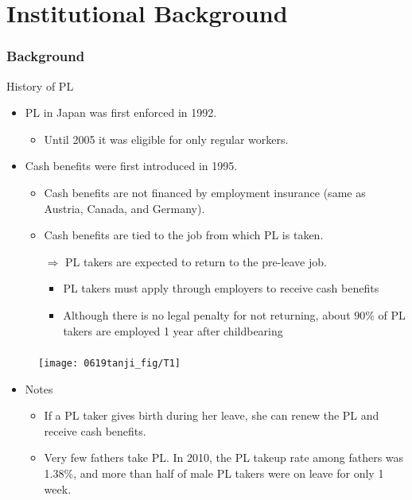 \documentclass[dvipdfmx,11pt]{beamer}
\begin{document}
\section{Institutional Background}

\begin{frame}\frametitle{Background}
  History of PL
  \begin{itemize}
    \item PL in Japan was first enforced in 1992.
    \begin{itemize}
      \item Until 2005 it was eligible for only regular workers.
    \end{itemize}
    \item Cash benefits were first introduced in 1995.
    \begin{itemize}
      \item Cash benefits are not financed by employment insurance (same as Austria, Canada, and Germany).
      \item Cash benefits are tied to the job from which PL is taken.

      $\Rightarrow$ PL takers are expected to return to the pre-leave job.
      \begin{itemize}
        \item PL takers must apply through employers to receive cash benefits
        \item Although there is no legal penalty for not returning, about 90\% of PL takers are employed 1 year after childbearing
      \end{itemize}
    \end{itemize}
  \end{itemize}
\end{frame}

\begin{frame}\frametitle{}
  \begin{figure}[h]
    \centering
    \texttt{[image: 0619tanji\_fig/T1]}
    \label{T1}
  \end{figure}
  \begin{itemize}
    \item Notes
    \begin{itemize}
      \item If a PL taker gives birth during her leave, she can renew the PL and receive cash benefits.
      \item Very few fathers take PL. In 2010, the PL takeup rate among fathers was 1.38\%, and more than half of male PL takers were on leave for only 1 week.
    \end{itemize}
  \end{itemize}
\end{frame}
\end{document}

